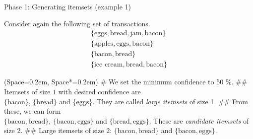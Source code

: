 \documentclass[12pt, aspectratio=1610]{beamer}
\newcommand{\listSpace}{0.2em}
\theoremstyle{plain}
\begin{document}
\begin{frame}[fragile]{Phase 1: Generating itemsets (example 1)}
	
	\begin{example}
		Consider again the following set of transactions.
		\vspace*{-1em}
		\begin{align*}
		\{ \text{eggs}, \text{bread}, \text{jam}, \text{bacon} \} \\ 
		\{ \text{apples} , \text{eggs}, \text{bacon} \} \\
		\{ \text{bacon} , \text{bread} \} \\
		\{ \text{ice cream} , \text{bread}, \text{bacon} \}
		\end{align*}
		\vspace{-2em}
		\begin{easylist}[itemize]
			\ListProperties(Space=\listSpace, Space*=\listSpace)
			# We set the minimum confidence to 50 \%.
			## Itemsets of size $1$ with desired confidence are \\
			$\{ \text{bacon} \}$, $\{ \text{bread} \}$ and $\{ \text{eggs} \}$.
			They are called \emph{large itemsets} of size 1.
			## From these, we can form \\
			$\{\text{bacon}, \text{bread}\}$,
			$\{\text{bacon}, \text{eggs}\}$ and
			$\{\text{bread}, \text{eggs}\}$.
			These are \emph{candidate itemsets} of size 2.
			## Large itemsets of size $2$: $\{\text{bacon}, \text{bread}\}$ and $\{\text{bacon}, \text{eggs}\}$.
		\end{easylist}
		\end{example}
\end{frame}
\end{document}
